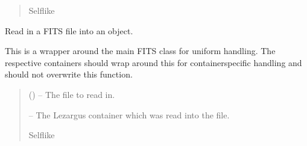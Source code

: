 \documentclass[letterpaper,11pt,english]{sphinxmanual}
\begin{document}
\begin{savenotes}
\begin{fulllineitems}
\begin{savenotes}
\begin{fulllineitems}
\begin{quote}
\begin{description}
\sphinxAtStartPar
Self\sphinxhyphen{}like

\end{description}\end{quote}

\end{fulllineitems}\end{savenotes}


\begin{savenotes}\begin{fulllineitems}
\label{\detokenize{code/lezargus.container.parent:lezargus.container.parent.LezargusContainerArithmetic._read_fits_file}}
\pysigstartsignatures
{}
\pysigstopsignatures
\sphinxAtStartPar
Read in a FITS file into an object.

\sphinxAtStartPar
This is a wrapper around the main FITS class for uniform handling.
The respective containers should wrap around this for
container\sphinxhyphen{}specific handling and should not overwrite this function.
\begin{quote}\begin{description}
\sphinxAtStartPar
{} () – The file to read in.

\sphinxAtStartPar
{} – The Lezargus container which was read into the file.

\sphinxAtStartPar
Self\sphinxhyphen{}like

\end{description}\end{quote}

\end{fulllineitems}\end{savenotes}



\end{fulllineitems}
\end{savenotes}
\end{document}
